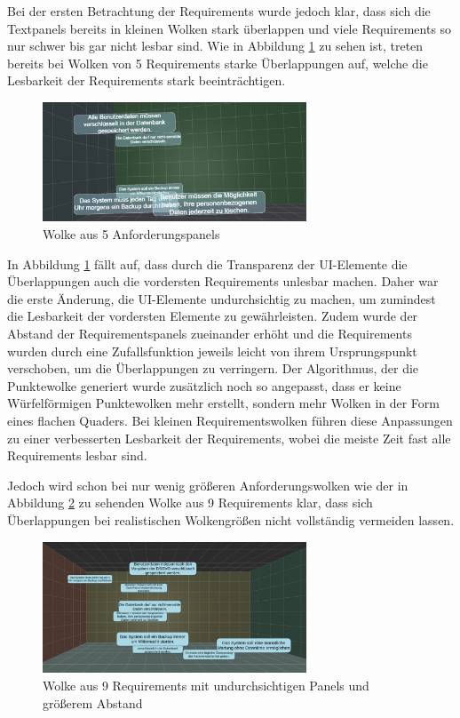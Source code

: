 Bei der ersten Betrachtung der Requirements wurde jedoch klar, dass sich die Textpanels bereits in kleinen Wolken stark überlappen und viele Requirements so nur schwer bis gar nicht lesbar sind.
Wie in Abbildung \ref{fig:wolken-prototyp} zu sehen ist, treten bereits bei Wolken von 5 Requirements  starke Überlappungen auf, welche die Lesbarkeit der Requirements stark beeinträchtigen.

\begin{figure}[H]
    \centering
    \includegraphics[width=0.7\textwidth]{images/WolkenPrototyp.png}
    \caption{Wolke aus 5 Anforderungspanels}
    \label{fig:wolken-prototyp}
\end{figure}

In Abbildung \ref{fig:wolken-prototyp} fällt auf, dass durch die Transparenz der UI-Elemente die Überlappungen auch die vordersten Requirements unlesbar machen.
Daher war die erste Änderung, die UI-Elemente undurchsichtig zu machen, um zumindest die Lesbarkeit der vordersten Elemente zu gewährleisten.
Zudem wurde der Abstand der Requirementspanels zueinander erhöht und die Requirements wurden durch eine Zufallsfunktion jeweils leicht von ihrem Ursprungspunkt verschoben, um die Überlappungen zu verringern.
Der Algorithmus, der die Punktewolke generiert wurde zusätzlich noch so angepasst, dass er keine Würfelförmigen Punktewolken mehr erstellt, sondern mehr Wolken in der Form eines flachen Quaders.
Bei kleinen Requirementswolken führen diese Anpassungen zu einer verbesserten Lesbarkeit der Requirements, wobei die meiste Zeit fast alle Requirements lesbar sind.

Jedoch wird schon bei nur wenig größeren Anforderungswolken wie der in Abbildung \ref{fig:wolken-prototyp-3} zu sehenden Wolke aus 9 Requirements klar, dass sich Überlappungen bei realistischen Wolkengrößen nicht vollständig vermeiden lassen.

\begin{figure}[H]
    \centering
    \includegraphics[width=0.7\textwidth]{images/WolkenPrototyp3.png}
    \caption{Wolke aus 9 Requirements mit undurchsichtigen Panels und größerem Abstand}
    \label{fig:wolken-prototyp-3}
\end{figure}

